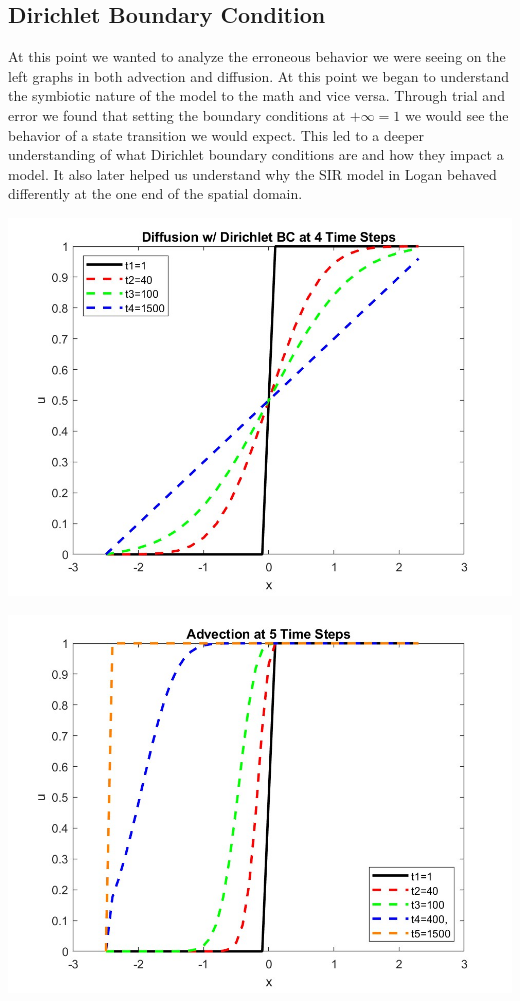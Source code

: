 \documentclass{article}
\begin{document}
\subsection{Dirichlet Boundary Condition}
At this point we wanted to analyze the erroneous behavior we were seeing on the left graphs in both advection and diffusion.  At this point we began to understand the symbiotic nature of the model to the math and vice versa.  Through trial and error we found that setting the boundary conditions at $+\infty=1$ we would see the behavior of a state transition we would expect. This led to a deeper understanding of what Dirichlet boundary conditions are and how they impact a model.  It also later helped us understand why the SIR model in Logan behaved differently at the one end of the spatial domain.\\
    \begin{minipage}[t]{.49\textwidth}
    \includegraphics[scale=0.20]{Step1a_HS_Diffusion_Dirichlet_4_timestamps.jpg}
    \label{fig:HS-Dirichlet-Diffusion}
    \end{minipage}
    \hfill
    \begin{minipage}[t]{.49\textwidth}
     \includegraphics[scale=0.20]{HS_Advection_Dirichlet_5_timestamp.jpg}
    \label{fig:HS-Dirichlet-Advection}
    \end{minipage}
\end{document}
